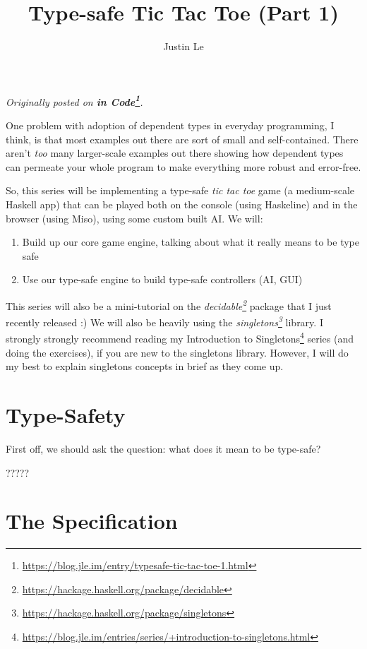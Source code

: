 \documentclass[]{article}
\title{Type-safe Tic Tac Toe (Part 1)}
\author{Justin Le}
\renewcommand{\href}[2]{#2\footnote{\url{#1}}}
\begin{document}
\maketitle

\emph{Originally posted on
\textbf{\href{https://blog.jle.im/entry/typesafe-tic-tac-toe-1.html}{in Code}}.}

One problem with adoption of dependent types in everyday programming, I think,
is that most examples out there are sort of small and self-contained. There
aren't \emph{too} many larger-scale examples out there showing how dependent
types can permeate your whole program to make everything more robust and
error-free.

So, this series will be implementing a type-safe \emph{tic tac toe} game (a
medium-scale Haskell app) that can be played both on the console (using
Haskeline) and in the browser (using Miso), using some custom built AI. We will:

\begin{enumerate}
\def\labelenumi{\arabic{enumi}.}
\tightlist
\item
  Build up our core game engine, talking about what it really means to be type
  safe
\item
  Use our type-safe engine to build type-safe controllers (AI, GUI)
\end{enumerate}

This series will also be a mini-tutorial on the
\emph{\href{https://hackage.haskell.org/package/decidable}{decidable}} package
that I just recently released :) We will also be heavily using the
\emph{\href{https://hackage.haskell.org/package/singletons}{singletons}}
library. I strongly strongly recommend reading my
\href{https://blog.jle.im/entries/series/+introduction-to-singletons.html}{Introduction
to Singletons} series (and doing the exercises), if you are new to the
singletons library. However, I will do my best to explain singletons concepts in
brief as they come up.

\hypertarget{type-safety}{%
\section{Type-Safety}\label{type-safety}}

First off, we should ask the question: what does it mean to be type-safe?

?????

\hypertarget{the-specification}{%
\section{The Specification}\label{the-specification}}
\end{document}
